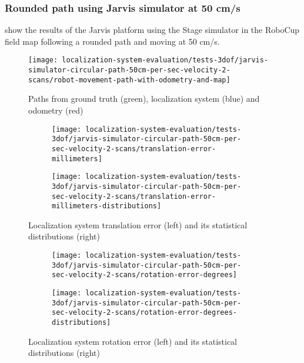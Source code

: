 \subsubsection{Rounded path using Jarvis simulator at 50 cm/s}

 show the results of the Jarvis platform using the Stage simulator in the RoboCup field map following a rounded path and moving at 50 cm/s.

\begin{figure}[H]
	\centering
	\texttt{[image: localization-system-evaluation/tests-3dof/jarvis-simulator-circular-path-50cm-per-sec-velocity-2-scans/robot-movement-path-with-odometry-and-map]}
	\caption{Paths from ground truth (green), localization system (blue) and odometry (red)}
	\label{fig:localization-system-evaluation_jarvis-simulator-circular-path-50cm-per-sec-velocity-2-scans}
\end{figure}

\begin{figure}[H]
	\centering
	\begin{subfigure}[h]{0.47\textwidth}
		\centering
		\texttt{[image: localization-system-evaluation/tests-3dof/jarvis-simulator-circular-path-50cm-per-sec-velocity-2-scans/translation-error-millimeters]}
	\end{subfigure}
	\begin{subfigure}[h]{0.47\textwidth}
		\centering
		\texttt{[image: localization-system-evaluation/tests-3dof/jarvis-simulator-circular-path-50cm-per-sec-velocity-2-scans/translation-error-millimeters-distributions]}
	\end{subfigure}
	\caption{Localization system translation error (left) and its statistical distributions (right)}
	\label{fig:localization-system-evaluation_jarvis-simulator-circular-path-50cm-per-sec-velocity-2-scans_translation-errors}
\end{figure}

\begin{figure}[H]
	\centering
	\begin{subfigure}[h]{0.47\textwidth}
		\centering
		\texttt{[image: localization-system-evaluation/tests-3dof/jarvis-simulator-circular-path-50cm-per-sec-velocity-2-scans/rotation-error-degrees]}
	\end{subfigure}
	\begin{subfigure}[h]{0.47\textwidth}
		\centering
		\texttt{[image: localization-system-evaluation/tests-3dof/jarvis-simulator-circular-path-50cm-per-sec-velocity-2-scans/rotation-error-degrees-distributions]}
	\end{subfigure}
	\caption{Localization system rotation error (left) and its statistical distributions (right)}
	\label{fig:localization-system-evaluation_jarvis-simulator-circular-path-50cm-per-sec-velocity-2-scans_rotation-errors}
\end{figure}

